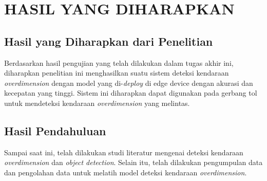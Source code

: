 \chapter{HASIL YANG DIHARAPKAN}
\label{chap:hasilyangdiharapkan}


\section{Hasil yang Diharapkan dari Penelitian}

Berdasarkan hasil pengujian yang telah dilakukan dalam tugas akhir ini, diharapkan penelitian ini menghasilkan suatu sistem deteksi kendaraan \emph{overdimension} dengan model yang di-\emph{deploy} di edge device dengan akurasi dan kecepatan yang tinggi. Sistem ini diharapkan dapat digunakan pada gerbang tol untuk mendeteksi kendaraan \emph{overdimension} yang melintas.


\section{Hasil Pendahuluan}

Sampai saat ini, telah dilakukan studi literatur mengenai deteksi kendaraan \emph{overdimension} dan \emph{object detection}. Selain itu, telah dilakukan pengumpulan data dan pengolahan data untuk melatih model deteksi kendaraan \emph{overdimension}.